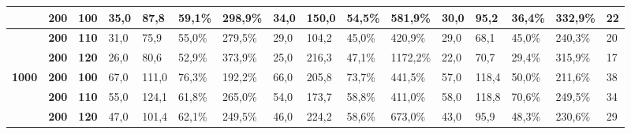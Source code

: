 \documentclass[conference,compsoc]{IEEEtran}
\begin{document}
\begin{adjustbox}{angle=90,width={\textwidth},totalheight={22cm},keepaspectratio,caption={Tabela de Resultados},center={14cm}}
\begin{tabular}{|l|l|l|l|l|l|l|l|l|l|l|l|l|l|l|l|}
\textbf{}                                            & \textbf{200}                                     & \textbf{100}                                        & 35,0            & 87,8           & 59,1\%              & 298,9\%            & 34,0            & 150,0          & 54,5\%              & 581,9\%            & 30,0            & 95,2           & 36,4\%              & 332,9\%            & 22                               \\ \hline
\textbf{}                                            & \textbf{200}                                     & \textbf{110}                                        & 31,0            & 75,9           & 55,0\%              & 279,5\%            & 29,0            & 104,2          & 45,0\%              & 420,9\%            & 29,0            & 68,1           & 45,0\%              & 240,3\%            & 20                               \\ \hline
\textbf{}                                            & \textbf{200}                                     & \textbf{120}                                        & 26,0            & 80,6           & 52,9\%              & 373,9\%            & 25,0            & 216,3          & 47,1\%              & 1172,2\%           & 22,0            & 70,7           & 29,4\%              & 315,9\%            & 17                               \\ \hline
\textbf{1000}                                        & \textbf{200}                                     & \textbf{100}                                        & 67,0            & 111,0          & 76,3\%              & 192,2\%            & 66,0            & 205,8          & 73,7\%              & 441,5\%            & 57,0            & 118,4          & 50,0\%              & 211,6\%            & 38                               \\ \hline
\textbf{}                                            & \textbf{200}                                     & \textbf{110}                                        & 55,0            & 124,1          & 61,8\%              & 265,0\%            & 54,0            & 173,7          & 58,8\%              & 411,0\%            & 58,0            & 118,8          & 70,6\%              & 249,5\%            & 34                               \\ \hline
\textbf{}                                            & \textbf{200}                                     & \textbf{120}                                        & 47,0            & 101,4          & 62,1\%              & 249,5\%            & 46,0            & 224,2          & 58,6\%              & 673,0\%            & 43,0            & 95,9           & 48,3\%              & 230,6\%            & 29                               \\ \hline

\end{tabular}
\end{adjustbox}
\end{document}
